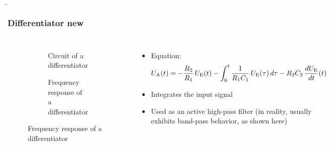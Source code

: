 \begin{frame}
    \b{
    \frametitle{Differentiator new}
    \begin{columns}
        \centering
        \begin{figure}
    \centering

    \begin{subfigure}{\linewidth}
        \centering
        \resizebox{0.6\linewidth}{!}{}
        \caption{Circuit of a differentiator}
    \end{subfigure}

    \vspace{0.5cm} 

    \begin{subfigure}{\linewidth}
        \centering
        \resizebox{0.6\linewidth}{!}{}
        \caption{Frequency response of a differentiator}
    \end{subfigure}

\end{figure}

        \raggedleft
        \begin{itemize}
            \item Equation:
          \[
U_{\textnormal{A}}(t) = 
- \frac{R_2}{R_1} \, U_{\textnormal{E}}(t)
- \int_0^t \frac{1}{R_1 C_1} \, U_{\textnormal{E}}(\tau) \, d\tau
- R_2 C_2 \, \frac{dU_{\textnormal{E}}}{dt}(t)
\]

        \item Integrates the input signal
        \item Used as an active high-pass filter (in reality, usually exhibits band-pass behavior, as shown here)  
    \end{itemize}
    \end{columns}
    }
\end{frame}


